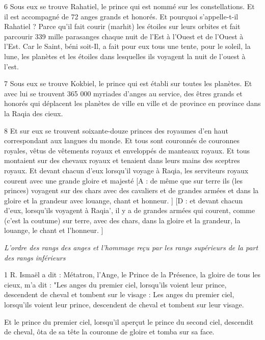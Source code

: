 \par 6 Sous eux se trouve Rahatiel, le prince qui est nommé sur les constellations. Et il est accompagné de 72 anges grands et honorés. Et pourquoi s'appelle-t-il Rahatiel ? Parce qu'il fait courir (marhit) les étoiles sur leurs orbites et fait parcourir 339 mille parasanges chaque nuit de l'Est à l'Ouest et de l'Ouest à l'Est. Car le Saint, béni soit-Il, a fait pour eux tous une tente, pour le soleil, la lune, les planètes et les étoiles dans lesquelles ils voyagent la nuit de l'ouest à l'est.

\par 7 Sous eux se trouve Kokbiel, le prince qui est établi sur toutes les planètes. Et avec lui se trouvent 365 000 myriades d'anges au service, des êtres grands et honorés qui déplacent les planètes de ville en ville et de province en province dans la Raqia des cieux.

\par 8 Et sur eux se trouvent soixante-douze princes des royaumes d'en haut correspondant aux langues du monde. Et tous sont couronnés de couronnes royales, vêtus de vêtements royaux et enveloppés de manteaux royaux. Et tous montaient sur des chevaux royaux et tenaient dans leurs mains des sceptres royaux. Et devant chacun d'eux lorsqu'il voyage à Raqia, les serviteurs royaux courent avec une grande gloire et majesté [A : de même que sur terre ils (les princes) voyagent sur des chars avec des cavaliers et de grandes armées et dans la gloire et la grandeur avec louange, chant et honneur. ] [D : et devant chacun d'eux, lorsqu'ils voyagent à Raqia', il y a de grandes armées qui courent, comme (c'est la coutume) sur terre, avec des chars, dans la gloire et la grandeur, la louange, le chant et l'honneur. ]



\par \textit{L'ordre des rangs des anges et l'hommage reçu par les rangs supérieurs de la part des rangs inférieurs}

\par 1 R. Ismaël a dit : Métatron, l'Ange, le Prince de la Présence, la gloire de tous les cieux, m'a dit : "Les anges du premier ciel, lorsqu'ils voient leur prince, descendent de cheval et tombent sur le visage : Les anges du premier ciel, lorsqu'ils voient leur prince, descendent de cheval et tombent sur leur visage.

\par Et le prince du premier ciel, lorsqu'il aperçut le prince du second ciel, descendit de cheval, ôta de sa tête la couronne de gloire et tomba sur sa face.

